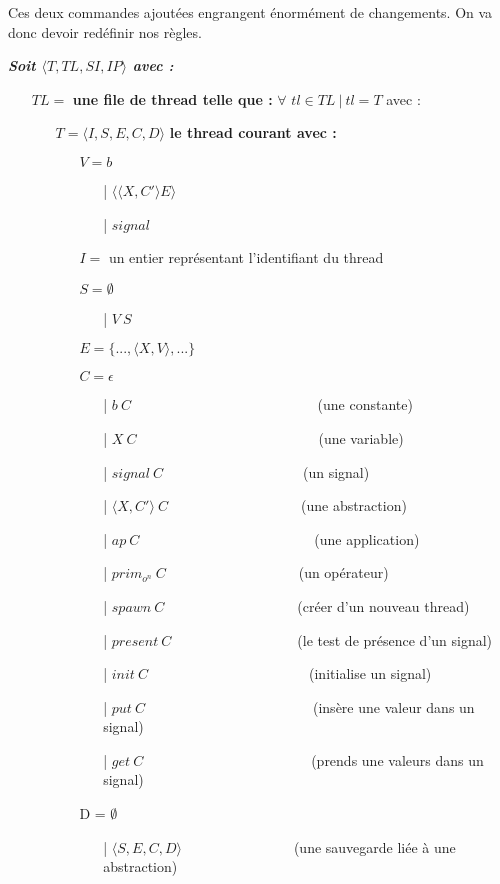 \documentclass[10pt,a4paper]{report}
\begin{document}
	Ces deux commandes ajoutées engrangent énormément de changements. On va donc devoir redéfinir nos règles. 
	\bigbreak
	
	\textbf{\textit{Soit $\langle T,TL,SI,IP\rangle$ avec :}}
	
	\begin{itemize}
		\item[] $TL =$ \textbf{une file de thread telle que :} $\forall$ $tl \in TL~|~tl = T$ avec :
		\begin{itemize}
			\item[] $T = \langle I,S,E,C,D\rangle$ \textbf{le thread courant avec :}
			\begin{itemize}
				\item[] $V = b$	
				\begin{itemize}
					\item[|] $\langle\langle X,C' \rangle E\rangle$
					\item[|] $signal$
				\end{itemize}
				\item[] $I =$ un entier représentant l'identifiant du thread
				\item[] $S =  \emptyset$ 
				\begin{itemize}
					\item[|] $V~S$
				\end{itemize}
				\item[] $E = \{...,\langle X,V\rangle,...\}$
				\item[] $C = \epsilon$
				\begin{itemize}
					\item[|] $b~C$~~~~~~~~~~~~~~~~~~~~~~~~~~    (une constante)
					\item[|] $X~C$~~~~~~~~~~~~~~~~~~~~~~~~~~(une variable)
					\item[|] $signal~C$~~~~~~~~~~~~~~~~~~~~(un signal)
					\item[|] $\langle X,C'\rangle~C$~~~~~~~~~~~~~~~~~~~(une abstraction)
					\item[|] $ap~C$~~~~~~~~~~~~~~~~~~~~~~~~~(une application)
					\item[|] $prim_{o^{n}}~C$~~~~~~~~~~~~~~~~~~~(un opérateur)
					\item[|] $spawn~C$~~~~~~~~~~~~~~~~~~~(créer d'un nouveau thread)
					\item[|] $present~C$~~~~~~~~~~~~~~~~~~(le test de présence d'un signal)
					\item[|] $init~C$~~~~~~~~~~~~~~~~~~~~~~~(initialise un signal)
					\item[|] $put~C$~~~~~~~~~~~~~~~~~~~~~~~~(insère une valeur dans un signal)
					\item[|] $get~C$~~~~~~~~~~~~~~~~~~~~~~~~(prends une valeurs dans un signal)
				\end{itemize}
				\item[] D = $\emptyset$
				\begin{itemize}
					\item[|] $\langle S,E,C,D\rangle$~~~~~~~~~~~~~~~~(une sauvegarde liée à une abstraction)
				\end{itemize}
			\end{itemize}	
		\end{itemize}
		

\end{itemize}
\end{document}
